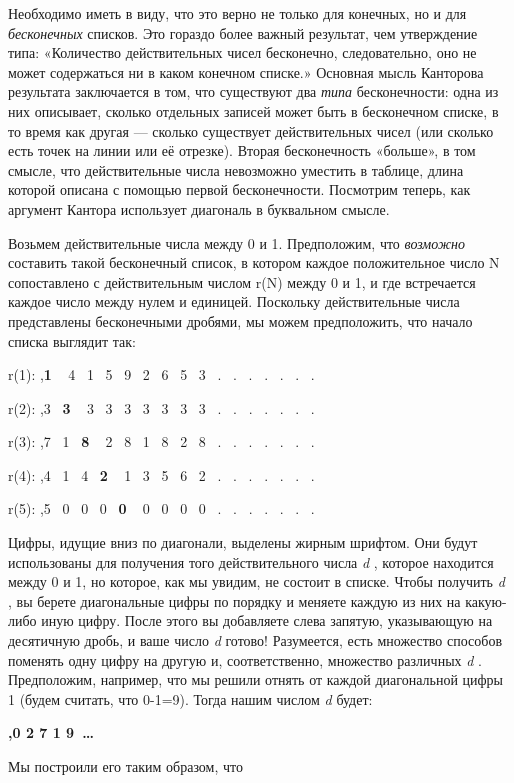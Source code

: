 \documentclass[../main.tex]{subfiles}
\begin{document}
Необходимо иметь в виду, что это верно не только для конечных, но и для \emph{бесконечных} списков. Это гораздо более важный результат, чем утверждение типа: «Количество действительных чисел бесконечно, следовательно, оно не может содержаться ни в каком конечном списке.» Основная мысль Канторова результата заключается в том, что существуют два \emph{типа} бесконечности: одна из них описывает, сколько отдельных записей может быть в бесконечном списке, в то время как другая --- сколько существует действительных чисел (или сколько есть точек на линии или её отрезке). Вторая бесконечность «больше», в том смысле, что действительные числа невозможно уместить в таблице, длина которой описана с помощью первой бесконечности. Посмотрим теперь, как аргумент Кантора использует диагональ в буквальном смысле.

Возьмем действительные числа между 0 и 1. Предположим, что \emph{возможно} составить такой бесконечный список, в котором каждое положительное число N сопоставлено с действительным числом r(N) между 0 и 1, и где встречается каждое число между нулем и единицей. Поскольку действительные числа представлены бесконечными дробями, мы можем предположить, что начало списка выглядит так:

r(1): ,\textbf{1} ~ 4~ 1~ 5~ 9~ 2~ 6~ 5~ 3~ .~ .~ .~ .~ .~ .~ .

r(2): ,3~ \textbf{3} ~ 3~ 3~ 3~ 3~ 3~ 3~ 3~ .~ .~ .~ .~ .~ .~ .

r(3): ,7~ 1~ \textbf{8} ~ 2~ 8~ 1~ 8~ 2~ 8~ .~ .~ .~ .~ .~ .~ .

r(4): ,4~ 1~ 4~ \textbf{2} ~ 1~ 3~ 5~ 6~ 2~ .~ .~ .~ .~ .~ .~ .

r(5): ,5~ 0~ 0~ 0~ \textbf{0} ~ 0~ 0~ 0~ 0~ .~ .~ .~ .~ .~ .~ .

Цифры, идущие вниз по диагонали, выделены жирным шрифтом. Они будут использованы для получения того действительного числа \emph{d} , которое находится между 0 и 1, но которое, как мы увидим, не состоит в списке. Чтобы получить \emph{d} , вы берете диагональные цифры по порядку и меняете каждую из них на какую-либо иную цифру. После этого вы добавляете слева запятую, указывающую на десятичную дробь, и ваше число \emph{d} готово! Разумеется, есть множество способов поменять одну цифру на другую и, соответственно, множество различных \emph{d} . Предположим, например, что мы решили отнять от каждой диагональной цифры 1 (будем считать, что 0-1=9). Тогда нашим числом \emph{d} будет:

\textbf{,0 2 7 1 9~\ldots{}}

Мы построили его таким образом, что
\end{document}
